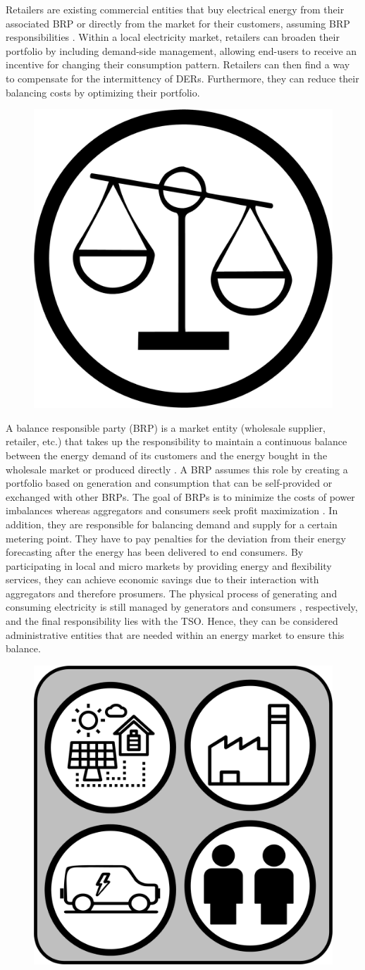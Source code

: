 Retailers are existing commercial entities that buy electrical energy from their associated BRP or directly from the market for their customers, assuming BRP responsibilities \cite{VILLAR2018Flexibility}. Within a local electricity market, retailers can broaden their portfolio by including demand-side management, allowing end-users to receive an incentive for changing their consumption pattern. Retailers can then find a way to compensate for the intermittency of DERs. Furthermore, they can reduce their balancing costs by optimizing their portfolio. \\

\begin{figure}
	\centering
	\includegraphics[width=0.1\columnwidth ]{ChapterIntro/Figures/BRP.jpg}
	\label{BRP}  
\end{figure}

A balance responsible party (BRP) is a market entity (wholesale supplier, retailer, etc.) that takes up the responsibility to maintain a continuous balance between the energy demand of its customers and the energy bought in the wholesale market or produced directly \cite{mandatova2014flexibility}. A BRP assumes this role by creating a portfolio based on generation and consumption that can be self-provided or exchanged with other BRPs. The goal of BRPs is to minimize the costs of power imbalances whereas aggregators and consumers seek profit maximization \cite{torbaghan2016local}. In addition, they are responsible for balancing demand and supply for a certain metering point. They have to pay penalties for the deviation from their energy forecasting after the energy has been delivered to end consumers. By participating in local and micro markets by providing energy and flexibility services, they can achieve economic savings due to their interaction with aggregators and therefore prosumers. The physical process of generating and consuming electricity is still managed by generators and consumers \cite{KULEnergyInstitute2015}, respectively, and the final responsibility lies with the TSO. Hence, they can be considered administrative entities that are needed within an energy market to ensure this balance.\\


\begin{figure}
	\centering
	\includegraphics[width=0.1\columnwidth ]{ChapterIntro/Figures/Prosumer.jpg}
	\label{Prosumer}  
\end{figure}

